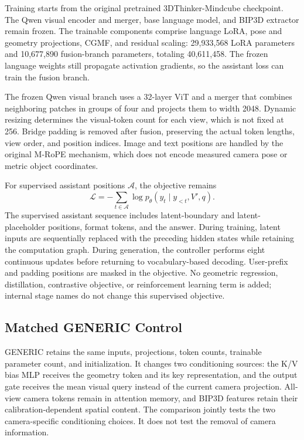 Training starts from the original pretrained 3DThinker-Mindcube checkpoint. The Qwen visual encoder and merger, base language model, and BIP3D extractor remain frozen. The trainable components comprise language LoRA, pose and geometry projections, CGMF, and residual scaling: 29,933,568 LoRA parameters and 10,677,890 fusion-branch parameters, totaling 40,611,458. The frozen language weights still propagate activation gradients, so the assistant loss can train the fusion branch.

The frozen Qwen visual branch uses a 32-layer ViT and a merger that combines neighboring patches in groups of four and projects them to width 2048. Dynamic resizing determines the visual-token count for each view, which is not fixed at 256. Bridge padding is removed after fusion, preserving the actual token lengths, view order, and position indices. Image and text positions are handled by the original M-RoPE mechanism, which does not encode measured camera pose or metric object coordinates.

For supervised assistant positions $\mathcal A$, the objective remains
\begin{equation}
\mathcal L=-\sum_{t\in\mathcal A}\log p_\theta(y_t\mid y_{<t},V',q).
\end{equation}
The supervised assistant sequence includes latent-boundary and latent-placeholder positions, format tokens, and the answer. During training, latent inputs are sequentially replaced with the preceding hidden states while retaining the computation graph. During generation, the controller performs eight continuous updates before returning to vocabulary-based decoding. User-prefix and padding positions are masked in the objective. No geometric regression, distillation, contrastive objective, or reinforcement learning term is added; internal stage names do not change this supervised objective.

\subsection{Matched GENERIC Control}
GENERIC retains the same inputs, projections, token counts, trainable parameter count, and initialization. It changes two conditioning sources: the K/V bias MLP receives the geometry token and its key representation, and the output gate receives the mean visual query instead of the current camera projection. All-view camera tokens remain in attention memory, and BIP3D features retain their calibration-dependent spatial content. The comparison jointly tests the two camera-specific conditioning choices. It does not test the removal of camera information.
